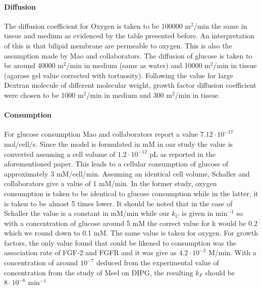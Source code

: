 \documentclass[11pt,a4paper]{article}
\begin{document}
\paragraph{Diffusion}
The diffusion coefficient for Oxygen is taken to be 100000 \textmu m$^2$/min the same in tissue and medium as evidenced by the table presented before. An interpretation of this is that bilipid membrane are permeable to oxygen. This is also the assumption made by Mao and collaborators.\cite{Mao2018} The diffusion of glucose is taken to be around 40000 \textmu m$^2$/min in medium (same as water) and 10000 \textmu m$^2$/min in tissue (agarose gel value corrected with tortuosity). Following the value for large Dextran molecule of different molecular weight, growth factor diffusion coefficient were chosen to be 1000 \textmu m$^2$/min in medium and 300  \textmu m$^2$/min in tissue.

\paragraph{Consumption}
For glucose consumption Mao and collaborators report a value $7.12 \cdot 10^{-17}$ mol/cell/s. Since the model is formulated in mM in our study the value is converted assuming a cell volume of $1.2 \cdot 10^{-12}$ pL as reported in the aforementioned paper. This leads to a cellular consumption of glucose of  approximately 3 mM/cell/min. Assuming an identical cell volume, Schaller and collaborators\cite{Kempf2005} give a value of 1 mM/min. In the former study, oxygen consumption is taken to be identical to glucose consumption while in the latter, it is taken to be almost 5  times lower.  It should be noted that in the case of Schaller the value is a constant in mM/min while our $k_C$ is given in min$^{-1}$ so with a concentration of glucose around 5 mM the correct value for k would be 0.2 which we round down to 0.1 mM. The same value is taken for oxygen. For growth factors, the only value found that could be likened to consumption was the association rate of FGF-2 and FGFR and it was give as $4.2 \cdot 10^{-2}$ \textmu M/min. With a concentration of around $10^{-7 }$ deduced from the experimental value of concentration from the study of Meel on DIPG, the resulting $k_F$ should be  $8 \cdot 10^{-6}$ min$^{-1}$
\end{document}
